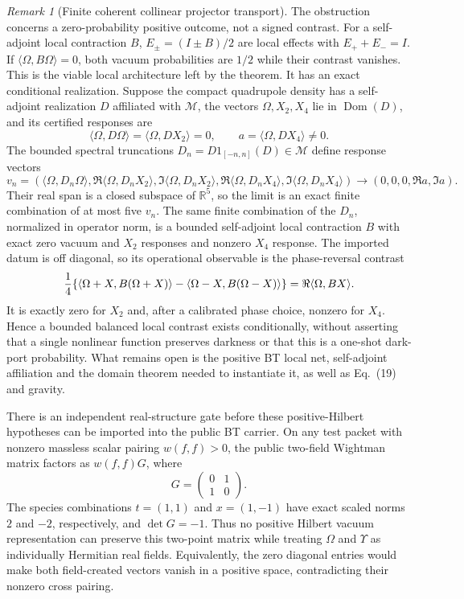 \documentclass[11pt]{article}
\theoremstyle{definition}
\theoremstyle{remark}
\newtheorem{remark}[theorem]{Remark}
\begin{document}
\begin{remark}[Finite coherent collinear projector transport]
The obstruction concerns a zero-probability positive outcome, not a signed
contrast.  For a self-adjoint local contraction $B$,
$E_\pm=(I\pm B)/2$ are local effects with $E_++E_-=I$.  If
$\langle\Omega,B\Omega\rangle=0$, both vacuum probabilities are $1/2$ while
their contrast vanishes.  This is the viable local architecture left by the
theorem.  It has an exact conditional realization.  Suppose the compact
quadrupole density has a self-adjoint realization $D$ affiliated with
$\mathcal M$, the vectors $\Omega,X_2,X_4$ lie in
$\operatorname{Dom}(D)$, and its certified responses are
\[
 \langle\Omega,D\Omega\rangle=\langle\Omega,DX_2\rangle=0,
 \qquad a=\langle\Omega,DX_4\rangle\ne0.
\]
The bounded spectral truncations
$D_n=D1_{[-n,n]}(D)\in\mathcal M$ define response vectors
\[
 v_n=(\langle\Omega,D_n\Omega\rangle,
 \Re\langle\Omega,D_nX_2\rangle,\Im\langle\Omega,D_nX_2\rangle,
 \Re\langle\Omega,D_nX_4\rangle,\Im\langle\Omega,D_nX_4\rangle)
 \longrightarrow(0,0,0,\Re a,\Im a).
\]
Their real span is a closed subspace of $\mathbb R^5$, so the limit is an
exact finite combination of at most five $v_n$.  The same finite combination
of the $D_n$, normalized in operator norm, is a bounded self-adjoint local
contraction $B$ with exact zero vacuum and $X_2$ responses and nonzero $X_4$
response.  The imported datum is off diagonal, so its operational observable
is the phase-reversal contrast
\[
 {1\over4}\{\langle\Omega+X,B(\Omega+X)\rangle
 -\langle\Omega-X,B(\Omega-X)\rangle\}
 =\Re\langle\Omega,BX\rangle .
\]
It is exactly zero for $X_2$ and, after a calibrated phase choice, nonzero for
$X_4$.  Hence a bounded balanced local contrast exists conditionally, without
asserting that a single nonlinear function preserves darkness or that this is
a one-shot dark-port probability.  What remains open is the positive BT local
net, self-adjoint affiliation and the domain theorem needed to instantiate
it, as well as Eq.~(19) and gravity.

There is an independent real-structure gate before these positive-Hilbert
hypotheses can be imported into the public BT carrier.  On any test packet
with nonzero massless scalar pairing $w(f,f)>0$, the public two-field
Wightman matrix factors as $w(f,f)G$, where
\[
 G=\begin{pmatrix}0&1\\1&0\end{pmatrix}.
\]
The species combinations $t=(1,1)$ and $x=(1,-1)$ have exact scaled norms
$2$ and $-2$, respectively, and $\det G=-1$.  Thus no positive Hilbert
vacuum representation can preserve this two-point matrix while treating
$\Omega$ and $\Upsilon$ as individually Hermitian real fields.  Equivalently,
the zero diagonal entries would make both field-created vectors vanish in a
positive space, contradicting their nonzero cross pairing.


\end{remark}
\end{document}
